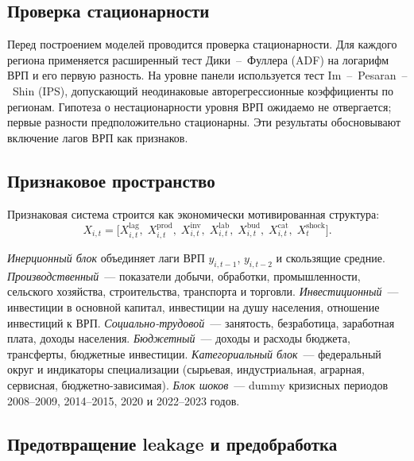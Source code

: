 \documentclass[12pt,a4paper]{article}
\begin{document}
\subsection{Проверка стационарности}

Перед построением моделей проводится проверка стационарности. Для каждого
региона применяется расширенный тест Дики~--~Фуллера (ADF) на логарифм ВРП
и его первую разность. На уровне панели используется тест Im~--~Pesaran~--~Shin
(IPS), допускающий неодинаковые авторегрессионные коэффициенты по регионам.
Гипотеза о нестационарности уровня ВРП ожидаемо не отвергается; первые
разности предположительно стационарны. Эти результаты обосновывают
включение лагов ВРП как признаков.

\subsection{Признаковое пространство}

Признаковая система строится как экономически мотивированная структура:
\begin{equation}
  X_{i,t} = \bigl[X^{\text{lag}}_{i,t},\; X^{\text{prod}}_{i,t},\;
  X^{\text{inv}}_{i,t},\; X^{\text{lab}}_{i,t},\; X^{\text{bud}}_{i,t},\;
  X^{\text{cat}}_{i,t},\; X^{\text{shock}}_t\bigr].
\end{equation}

\textit{Инерционный блок} объединяет лаги ВРП $y_{i,t-1}$, $y_{i,t-2}$
и скользящие средние. \textit{Производственный}~--- показатели добычи,
обработки, промышленности, сельского хозяйства, строительства, транспорта
и торговли. \textit{Инвестиционный}~--- инвестиции в основной капитал,
инвестиции на душу населения, отношение инвестиций к ВРП.
\textit{Социально-трудовой}~--- занятость, безработица, заработная плата,
доходы населения. \textit{Бюджетный}~--- доходы и расходы бюджета,
трансферты, бюджетные инвестиции. \textit{Категориальный блок}~---
федеральный округ и индикаторы специализации (сырьевая, индустриальная,
аграрная, сервисная, бюджетно-зависимая). \textit{Блок шоков}~--- dummy
кризисных периодов 2008--2009, 2014--2015, 2020 и 2022--2023 годов.

\subsection{Предотвращение leakage и предобработка}
\end{document}
